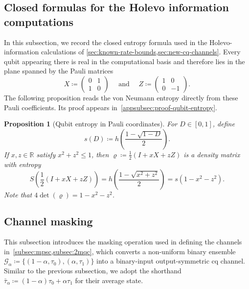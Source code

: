 \documentclass[11pt]{article}
\renewcommand{\leq}{\leqslant}
\newtheorem{prop}[prop]{Proposition}
\theoremstyle{remark}
\newcommand{\cG}{\mathcal{G}}
\begin{document}
\subsection{Closed formulas for the Holevo information computations}
\label{subsec:holevo-formulas}

In this subsection, we record the closed entropy formula used in the Holevo-information calculations of \cref{sec:known-rate-bounds,sec:new-cq-channels}. Every qubit appearing there is real in the computational basis and therefore lies in the plane spanned by the Pauli matrices
\begin{equation}
\label{eq:pauli-matrices}
X \coloneqq \begin{pmatrix} 0 & 1 \\ 1 & 0 \end{pmatrix}
\quad
\text{ and }
\quad
Z \coloneqq \begin{pmatrix}1 & 0 \\ 0 & -1 \end{pmatrix}.
\end{equation}
The following proposition reads the von Neumann entropy directly from these Pauli coefficients. Its proof appears in~\cref{appsubsec:proof-qubit-entropy}.

\begin{prop}[Qubit entropy in Pauli coordinates]
\label{prop:qubit-entropy}
For $D \in [0,1]$, define
\begin{equation}
\label{eq:qubit-entropy}
s(D) \coloneqq h\left(\frac{1-\sqrt{1-D}}{2}\right).
\end{equation}
If $x,z \in \mathbb{R}$ satisfy $x^2+z^2 \leq 1$, then $\varrho \coloneqq \frac{1}{2}(I+xX+zZ)$ is a density matrix with entropy
\begin{equation*}
S\left(\frac{1}{2}(I+xX+zZ)\right)
= h\left(\frac{1-\sqrt{x^2+z^2}}{2}\right)
= s(1-x^2-z^2).
\end{equation*}
Note that $4\det(\varrho) = 1-x^2-z^2$.
\end{prop}

\subsection{Channel masking}
\label{subsec:masking}

This subsection introduces the masking operation used in defining the channels in~\cref{subsec:mpsc,subsec:2mqc}, which converts a non-uniform binary ensemble $\cG_\alpha \coloneqq \{(1-\alpha,\tau_0),(\alpha,\tau_1)\}$ into a binary-input output-symmetric cq channel. Similar to the previous subsection, we adopt the shorthand $\bar{\tau}_\alpha \coloneqq (1-\alpha)\tau_0+\alpha \tau_1$ for their average state.
\end{document}
